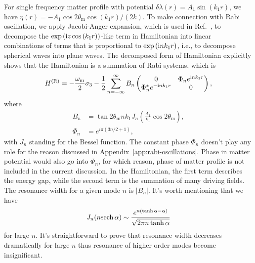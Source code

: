 For single frequency matter profile with potential $\delta\lambda(r) = A_1\sin(k_1 r)$, we have $\eta(r) = - A_1 \cos 2\theta_{\mathrm m} \cos (k_1 r)/(2 k) $. To make connection with Rabi oscillation, we apply Jacobi-Anger expansion, which is used in Ref.~\cite{Kneller2013}, to decompose the $\exp\left( \mathrm{i} z \cos\left(k_1 r \right) \right)$-like term in Hamiltonian into linear combinations of terms that is proportional to $\exp\left(\mathrm{i} n k_1 r \right)$, i.e., to decompose spherical waves into plane waves. The decomposed form of Hamiltonian explicitly shows that the Hamiltonian is a summation of Rabi systems, which is
\begin{equation}
    H^{(\mathrm{R})} =
    -\frac{\omega_{\mathrm{m}}}{2} \sigma_3
    -  \frac{1}{2} \sum_{n=-\infty}^\infty B_n \begin{pmatrix}
    0 &  \Phi_n e^{\ri n k_1  r} \\
     \Phi_n^* e^{ - \ri n k_1 r} & 0
    \end{pmatrix},
    \label{chap:matter-sec:jacobi-eqn:hamil-jacobi-expanded}
\end{equation}
where
\begin{align*}
    B_n &= \tan 2\theta_{\mathrm m} n k_1 J_{n} \left( \frac{A_1}{k_1}\cos 2\theta_{\mathrm m} \right),\\
    \Phi_n &= e^{i\pi (3n/2+1)},
\end{align*}
with $J_n$ standing for the Bessel function.
The constant phase $\Phi_n$ doesn't play any role for the reason discussed in Appendix~\ref{app:rabi-oscillations}. Phase in matter potential would also go into $\Phi_n$, for which reason, phase of matter profile is not included in the current discussion. In the Hamiltonian, the first term describes the energy gap, while the second term is the summation of many driving fields. The resonance width for a given mode $n$ is $\lvert B_{n}\rvert$. It's worth mentioning that we have~\cite{Ploumistakis20092897}
\begin{equation}
J_n(n {\operatorname{sech}{\alpha}}) \sim \frac{ e^{n(\tanh\alpha - \alpha)} }{\sqrt{ 2\pi n \tanh \alpha } }
\end{equation}
for large $n$. It's straightforward to prove that resonance width decreases dramatically for large $n$ thus resonance of higher order modes become insignificant.




